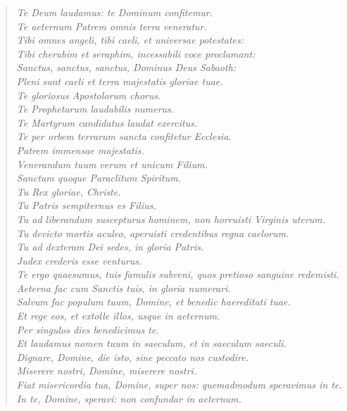 \begin{quote}
\textit{Te Deum laudamus: te Dominum confitemur.\\
Te aeternum Patrem omnis terra veneratur.\\
Tibi omnes angeli, tibi caeli, et universae potestates:\\
Tibi cherubim et seraphim, incessabili voce proclamant:\\
Sanctus, sanctus, sanctus, Dominus Deus Sabaoth:\\
Pleni sunt caeli et terra majestatis gloriae tuae.\\
Te gloriosus Apostolorum chorus.\\
Te Prophetarum laudabilis numerus.\\
Te Martyrum candidatus laudat exercitus.\\
Te per orbem terrarum sancta confitetur Ecclesia.\\
Patrem immensae majestatis.\\
Venerandum tuum verum et unicum Filium.\\
Sanctum quoque Paraclitum Spiritum.\\
Tu Rex gloriae, Christe.\\
Tu Patris sempiternus es Filius.\\
Tu ad liberandum suscepturus hominem, non horruisti Virginis uterum.\\
Tu devicto mortis aculeo, aperuisti credentibus regna caelorum.\\
Tu ad dexteram Dei sedes, in gloria Patris.\\
Judex crederis esse venturus.\\
Te ergo quaesumus, tuis famulis subveni, quos pretioso sanguine redemisti.\\
Aeterna fac cum Sanctis tuis, in gloria numerari.\\
Salvum fac populum tuum, Domine, et benedic haereditati tuae.\\
Et rege eos, et extolle illos, usque in aeternum.\\
Per singulos dies benedicimus te.\\
Et laudamus nomen tuum in saeculum, et in saeculum saeculi.\\
Dignare, Domine, die isto, sine peccato nos custodire.\\
Miserere nostri, Domine, miserere nostri.\\
Fiat misericordia tua, Domine, super nos: quemadmodum speravimus in te.\\
In te, Domine, speravi: non confundar in aeternum.}
\end{quote}

